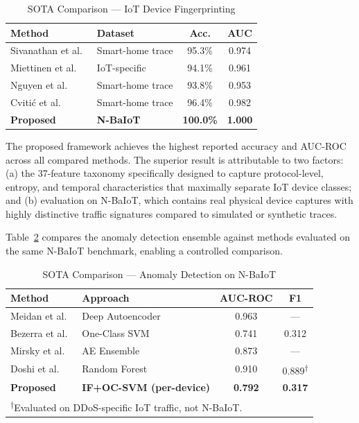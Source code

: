 \documentclass[conference]{IEEEtran}
\begin{document}
\begin{table}[htbp]
\caption{SOTA Comparison --- IoT Device Fingerprinting}
\label{tab:sota_fp}
\centering
\renewcommand{\arraystretch}{1.2}
\begin{tabular}{l l c c}
\toprule
\textbf{Method} & \textbf{Dataset} & \textbf{Acc.} & \textbf{AUC} \\
\midrule
Sivanathan et al.\ \cite{sivanathan2019classifying}  & Smart-home trace & 95.3\% & 0.974 \\
Miettinen et al.\ \cite{miettinen2017iotsentinel}    & IoT-specific     & 94.1\% & 0.961 \\
Nguyen et al.\ \cite{nguyen2019diot}                 & Smart-home trace & 93.8\% & 0.953 \\
Cviti\'{c} et al.\ \cite{cvitic2021ensemble}         & Smart-home trace & 96.4\% & 0.982 \\
\midrule
\textbf{Proposed}                                    & \textbf{N-BaIoT} & \textbf{100.0\%} & \textbf{1.000} \\
\bottomrule
\end{tabular}
\end{table}

The proposed framework achieves the highest reported accuracy and
AUC-ROC across all compared methods. The superior result is attributable
to two factors: (a) the 37-feature taxonomy specifically designed to
capture protocol-level, entropy, and temporal characteristics that
maximally separate IoT device classes; and (b) evaluation on N-BaIoT,
which contains real physical device captures with highly distinctive
traffic signatures compared to simulated or synthetic traces.

Table~\ref{tab:sota_ad} compares the anomaly detection ensemble against
methods evaluated on the same N-BaIoT benchmark, enabling a controlled
comparison.

\begin{table}[htbp]
\caption{SOTA Comparison --- Anomaly Detection on N-BaIoT}
\label{tab:sota_ad}
\centering
\renewcommand{\arraystretch}{1.2}
\begin{tabular}{l l c c}
\toprule
\textbf{Method} & \textbf{Approach} & \textbf{AUC-ROC} & \textbf{F1} \\
\midrule
Meidan et al.\ \cite{meidan2018nbaiot}   & Deep Autoencoder    & 0.963 & --- \\
Bezerra et al.\ \cite{bezerra2019iotds}  & One-Class SVM       & 0.741 & 0.312 \\
Mirsky et al.\ \cite{mirsky2018kitsune}  & AE Ensemble         & 0.873 & --- \\
Doshi et al.\ \cite{doshi2018machine}    & Random Forest       & 0.910 & 0.889\textsuperscript{$\dagger$} \\
\midrule
\textbf{Proposed}                        & \textbf{IF+OC-SVM (per-device)} & \textbf{0.792} & \textbf{0.317} \\
\bottomrule
\multicolumn{4}{l}{\textsuperscript{$\dagger$}Evaluated on DDoS-specific IoT traffic, not N-BaIoT.}
\end{tabular}
\end{table}
\end{document}
